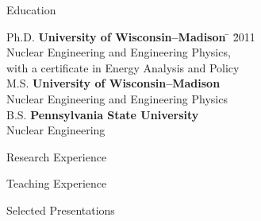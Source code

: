 \documentclass{resume2} %
\begin{document}

\begin{rSection}{Education}

\begin{tabbing}
Ph.D. \hspace*{2 em}\= \textbf{University of Wisconsin--Madison} \hspace*{5em} \= \hspace*{15em} \= 2011 \\
      \> Nuclear Engineering and Engineering Physics, \\ \>with a certificate in Energy Analysis and Policy \\
%
M.S. \hspace*{2 em}\> \textbf{University of Wisconsin--Madison} \>  \\
      \> Nuclear Engineering and Engineering Physics \\
%
B.S. \hspace*{2 em}\> \textbf{Pennsylvania State University} \>  \\
      \> Nuclear Engineering
\end{tabbing}
\end{rSection}

\begin{rSection}{Research Experience}

\end{rSection}

\begin{rSection}{Teaching Experience}

\end{rSection}

\begin{rSection}{Selected Presentations}

\end{rSection}
\end{document}
